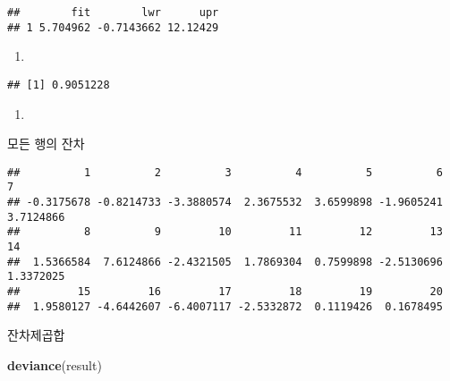 \documentclass[
]{article}
\newenvironment{Shaded}{\begin{snugshade}}{\end{snugshade}}
\newcommand{\KeywordTok}[1]{\textcolor[rgb]{0.13,0.29,0.53}{\textbf{#1}}}
\newcommand{\NormalTok}[1]{#1}
\newcommand{\OperatorTok}[1]{\textcolor[rgb]{0.81,0.36,0.00}{\textbf{#1}}}
\begin{document}
\begin{verbatim}
##        fit        lwr      upr
## 1 5.704962 -0.7143662 12.12429
\end{verbatim}

\begin{enumerate}
\def\labelenumi{(\alph{enumi})}
\setcounter{enumi}{6}
\item
\end{enumerate}

\begin{Shaded}
\end{Shaded}

\begin{verbatim}
## [1] 0.9051228
\end{verbatim}

\begin{enumerate}
\def\labelenumi{(\alph{enumi})}
\setcounter{enumi}{7}
\item
\end{enumerate}

모든 행의 잔차

\begin{Shaded}
\end{Shaded}

\begin{verbatim}
##          1          2          3          4          5          6          7 
## -0.3175678 -0.8214733 -3.3880574  2.3675532  3.6599898 -1.9605241  3.7124866 
##          8          9         10         11         12         13         14 
##  1.5366584  7.6124866 -2.4321505  1.7869304  0.7599898 -2.5130696  1.3372025 
##         15         16         17         18         19         20 
##  1.9580127 -4.6442607 -6.4007117 -2.5332872  0.1119426  0.1678495
\end{verbatim}

잔차제곱합

\begin{Shaded}
\begin{Highlighting}[]
\KeywordTok{deviance}\NormalTok{(result)}
\end{Highlighting}
\end{Shaded}
\end{document}
